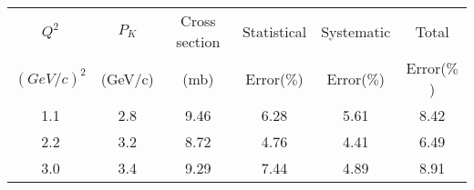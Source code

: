 \begin{center}
\begin{tabular}{||c|c|c|c|c|c||}\hline
 $Q^2$ & $P_K$ & Cross section & Statistical & Systematic & Total \\
 $(GeV/c)^2$ & (GeV/c)& (mb) & Error($\%$)& Error($\%$)&Error($\%$) \\\hline
1.1 & 2.8& 9.46 & 6.28 & 5.61 & 8.42\\
2.2 & 3.2& 8.72 & 4.76 & 4.41 & 6.49\\
3.0 & 3.4& 9.29 & 7.44 & 4.89 & 8.91\\\hline
\end{tabular}
\end{center}